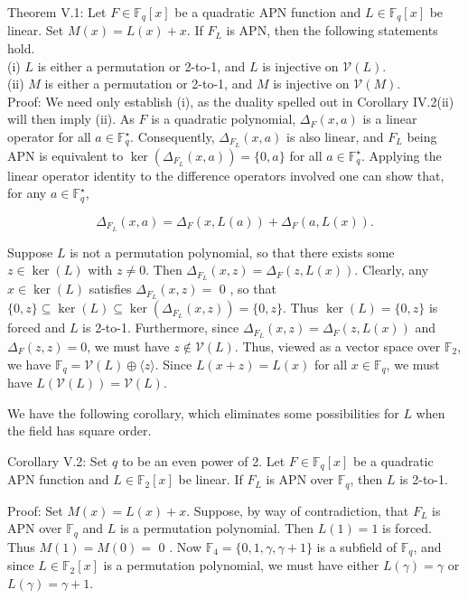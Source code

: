 \documentclass[10pt]{article}
\begin{document}
Theorem V.1: Let $F \in \mathbb{F}_{q}[x]$ be a quadratic APN function and $L \in \mathbb{F}_{q}[x]$ be linear. Set $M(x)=L(x)+x$. If $F_{L}$ is APN, then the following statements hold.\\
(i) $L$ is either a permutation or 2-to-1, and $L$ is injective on $\mathcal{V}(L)$.\\
(ii) $M$ is either a permutation or 2-to-1, and $M$ is injective on $\mathcal{V}(M)$.\\
Proof: We need only establish (i), as the duality spelled out in Corollary IV.2(ii) will then imply (ii). As $F$ is a quadratic polynomial, $\Delta_{F}(x, a)$ is a linear operator for all $a \in \mathbb{F}_{q}^{\star}$. Consequently, $\Delta_{F_{L}}(x, a)$ is also linear, and $F_{L}$ being APN is equivalent to $\operatorname{ker}\left(\Delta_{F_{L}}(x, a)\right)=\{0, a\}$ for all $a \in \mathbb{F}_{q}^{\star}$. Applying the linear operator identity to the difference operators involved one can show that, for any $a \in \mathbb{F}_{q}^{\star}$,


\begin{equation*}
\Delta_{F_{L}}(x, a)=\Delta_{F}(x, L(a))+\Delta_{F}(a, L(x)) . \tag{5}
\end{equation*}


Suppose $L$ is not a permutation polynomial, so that there exists some $z \in \operatorname{ker}(L)$ with $z \neq 0$. Then $\Delta_{F_{L}}(x, z)= \Delta_{F}(z, L(x))$. Clearly, any $x \in \operatorname{ker}(L)$ satisfies $\Delta_{F_{L}}(x, z)=$ 0 , so that $\{0, z\} \subseteq \operatorname{ker}(L) \subseteq \operatorname{ker}\left(\Delta_{F_{L}}(x, z)\right)=\{0, z\}$. Thus $\operatorname{ker}(L)=\{0, z\}$ is forced and $L$ is 2-to-1. Furthermore, since $\Delta_{F_{L}}(x, z)=\Delta_{F}(z, L(x))$ and $\Delta_{F}(z, z)=0$, we must have $z \notin \mathcal{V}(L)$. Thus, viewed as a vector space over $\mathbb{F}_{2}$, we have $\mathbb{F}_{q}=\mathcal{V}(L) \oplus\langle z\rangle$. Since $L(x+z)=L(x)$ for all $x \in \mathbb{F}_{q}$, we must have $L(\mathcal{V}(L))=\mathcal{V}(L)$.

We have the following corollary, which eliminates some possibilities for $L$ when the field has square order.

Corollary V.2: Set $q$ to be an even power of 2. Let $F \in \mathbb{F}_{q}[x]$ be a quadratic APN function and $L \in \mathbb{F}_{2}[x]$ be linear. If $F_{L}$ is APN over $\mathbb{F}_{q}$, then $L$ is 2-to-1.

Proof: Set $M(x)=L(x)+x$. Suppose, by way of contradiction, that $F_{L}$ is APN over $\mathbb{F}_{q}$ and $L$ is a permutation polynomial. Then $L(1)=1$ is forced. Thus $M(1)=M(0)=$ 0 . Now $\mathbb{F}_{4}=\{0,1, \gamma, \gamma+1\}$ is a subfield of $\mathbb{F}_{q}$, and since $L \in \mathbb{F}_{2}[x]$ is a permutation polynomial, we must have either $L(\gamma)=\gamma$ or $L(\gamma)=\gamma+1$.
\end{document}
